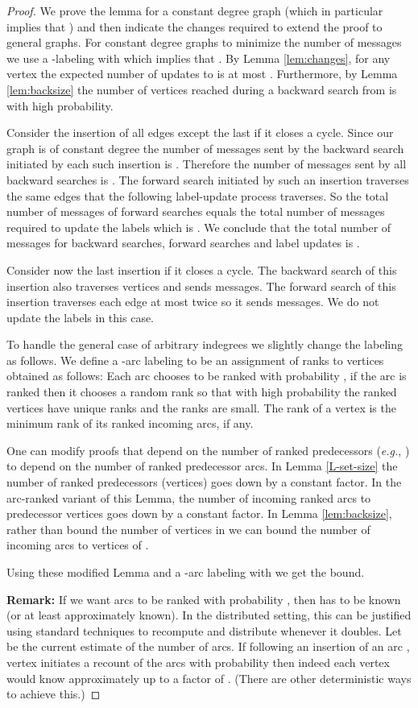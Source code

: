 \documentclass[11pt]{article}
\theoremstyle{plain}
\theoremstyle{definition}
\theoremstyle{remark}
\numberwithin{equation}{section}
\begin{document}
\begin{proof}
We prove the lemma for a constant degree graph (which in particular
implies that ) and then indicate the changes required
to extend the proof to general graphs.
 For constant degree graphs to minimize the number of messages we use a -labeling with
 which implies that . By Lemma \ref{lem:changes}, for any vertex  the
expected number of updates to  is at most . Furthermore, by Lemma \ref{lem:backsize} the
 number of vertices reached during a backward search from
 is  with high probability.

Consider the insertion of all edges except the last if it closes a
 cycle. Since our graph is of constant degree
the  number of messages sent by the backward search initiated by
each such insertion is . Therefore the number
of messages sent by all backward searches is .
The forward search initiated by such an insertion traverses the same
edges that the following label-update process traverses. So the
total number of messages of forward searches equals  the total
number of messages required to update the labels which is . We conclude that the total number of messages for
backward searches, forward searches and label updates is .



Consider now the last insertion if it closes a cycle. The backward
search of this insertion also traverses 
 vertices and sends  messages. The forward search of
 this insertion traverses each edge at most twice so it sends 
 messages. We do not update the labels in this case.

To handle the general case of arbitrary indegrees we slightly change
the labeling as follows. We define a -arc labeling to be an
assignment of ranks to vertices obtained as follows: Each arc
chooses to be ranked with probability , if the arc is ranked then
it chooses a random rank so that with high probability the ranked
vertices have unique ranks and the ranks are small. The rank of a
vertex is the minimum rank of its ranked incoming arcs, if any.

One can modify proofs that depend on the number of ranked
predecessors ({\sl e.g.}, ) to depend on the number of ranked
predecessor arcs. In Lemma \ref{L-set-size} the number of ranked
predecessors (vertices) goes down by a constant factor. In the
arc-ranked variant of this Lemma, the number of incoming ranked arcs
to predecessor vertices goes
 down by a constant factor. In Lemma \ref{lem:backsize}, rather
 than bound the number of vertices in  we can bound the
 number of incoming arcs to vertices of .

 Using these modified Lemma and a -arc labeling with  we get the  bound.

{\bf Remark:} If we want arcs to be ranked with probability
, then  has to be known (or at least approximately
known).
 In the distributed setting, this can  be justified using
standard techniques to recompute and distribute  whenever it
doubles. Let  be the current estimate of the
number of arcs. If following an insertion of an arc , vertex
 initiates a recount of the arcs with probability
 then indeed each vertex would know 
approximately up to a factor of . (There are other deterministic
ways to achieve this.)
\end{proof}
\end{document}
